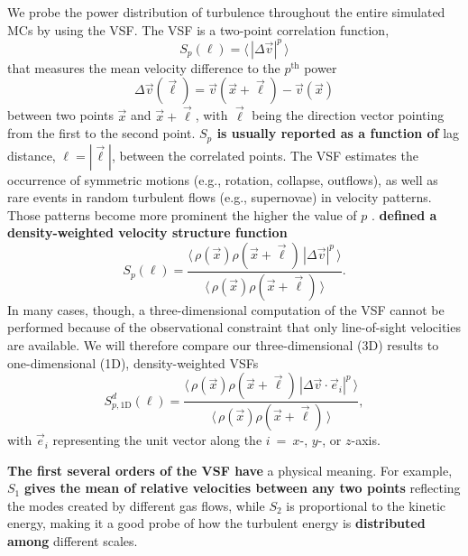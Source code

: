 We probe the power distribution of turbulence throughout the entire simulated MCs by using the VSF.
The VSF is a two-point correlation function,
\begin{equation}
	{S}_p (\ell) = \langle \, |\Delta \vec{v}|^p  \, \rangle
    \label{equ:method:def_vsf}
\end{equation}
that measures the mean velocity difference to the $p^\mathrm{th}$ power
\begin{equation}\Delta \vec{v} (\vec{\ell}) = \vec{v}(\vec{x}+\vec{\ell}) - \vec{v}(\vec{x})
\end{equation} 
between two points $\vec{x}$ and $\vec{x}+\vec{\ell}$, with $\vec{\ell}$ being the direction vector pointing from the first to the second point.  
\textbf{$S_p$ is usually reported as a function of} lag distance, $\ell = |\vec{\ell}|$, between the correlated points.
The VSF estimates the occurrence of symmetric motions (e.g., rotation, collapse, outflows), as well as rare events in random turbulent flows (e.g., supernovae) in velocity patterns.
Those patterns become more prominent the higher the value of $p$ \citep{Heyer2004}.
\textbf{\citet{Padoan2016a} defined a density-weighted velocity structure function}
\begin{equation}
	{S}_p (\ell) = \frac{\langle \, \rho(\vec{x}) \rho(\vec{x}+\vec{\ell}) \, |\Delta \vec{v}|^p  \, \rangle}{\langle  \, \rho(\vec{x}) \rho(\vec{x}+\vec{\ell}) \, \rangle}.
    \label{equ:method:def_vsf_dw}
\end{equation}
   In many cases, though, a three-dimensional computation of the VSF cannot be performed 
   because of the observational constraint that only line-of-sight velocities are available.  We 
   will therefore compare our three-dimensional (3D) results to one-dimensional (1D), 
   density-weighted VSFs
   \begin{equation}
	\mathit{S}^d_{p,\mathrm{1D}} (\ell) = \frac{\langle \, \rho(\vec{x}) \rho(\vec{x}+\vec{\ell}) \, |\Delta 
        \vec{v} \cdot \vec{e}_i|^p  \, \rangle}{\langle  \, \rho(\vec{x}) \rho(\vec{x}+\vec{\ell}) \, \rangle} ,
   \label{equ:results:def_vsf_1d}
   \end{equation}
    with $\vec{e}_i$ representing the unit vector along the $i$~=~$x$-, $y$-, or $z$-axis.

\textbf{The first several orders of the VSF have} a physical meaning. 
For example, $\mathit{S}_1$ \textbf{ gives the mean of relative velocities between any two points} reflecting the modes created by different gas flows, while $\mathit{S}_2$ is proportional to the kinetic energy, making it a good probe of how the turbulent energy is \textbf{distributed among} different scales.

